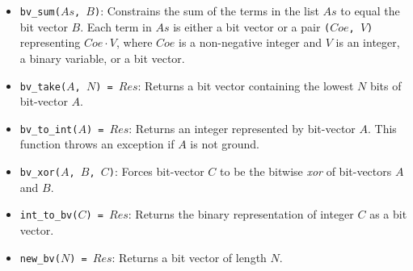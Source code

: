 \begin{itemize}
\item \texttt{bv\_sum($As$, $B$)}: Constrains the sum of the terms in the list $As$ to equal the bit vector $B$. Each term in $As$ is either a bit vector or a pair \texttt{($Coe$, $V$)} representing $Coe \cdot V$, where $Coe$ is a non-negative integer and $V$ is an integer, a binary variable, or a bit vector.
\item \texttt{bv\_take($A$, $N$) = $Res$}: Returns a bit vector containing the lowest $N$ bits of bit-vector $A$.
\item \texttt{bv\_to\_int($A$)  = $Res$}: Returns an integer represented by bit-vector $A$. This function throws an exception if $A$ is not ground.
\item \texttt{bv\_xor($A$, $B$, $C$)}: Forces bit-vector $C$ to be the bitwise \textit{xor} of bit-vectors $A$ and $B$.
\item \texttt{int\_to\_bv($C$) = $Res$}: Returns the binary representation of integer $C$ as a bit vector.
\item \texttt{new\_bv($N$)  = $Res$}: Returns a bit vector of length $N$.
\end{itemize}

